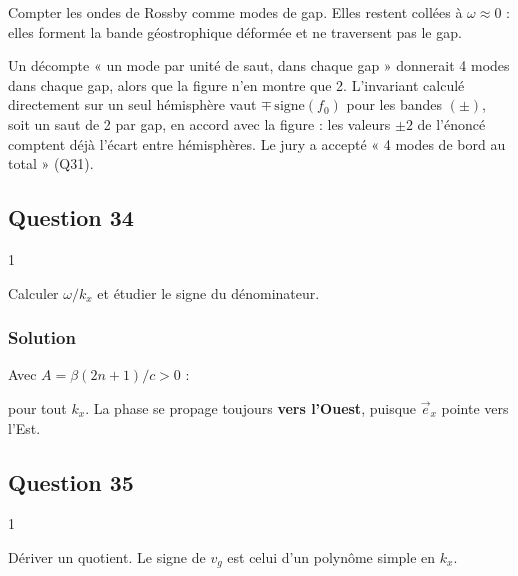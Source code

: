 \documentclass[11pt,a4paper]{article}
\newcommand{\equationajustee}[1]{%
  \sbox{\boiteequation}{$\displaystyle #1$}%
  \ifdim\wd\boiteequation>\linewidth
    \[\resizebox{\linewidth}{!}{\usebox{\boiteequation}}\]%
  \else
    \[#1\]%
  \fi}
\begin{document}
\begin{piege}

Compter les ondes de Rossby comme modes de gap. Elles restent collées à \(\omega\approx0\) : elles forment la bande géostrophique déformée et ne traversent pas le gap.

\end{piege}

\begin{piege}

Un décompte « un mode par unité de saut, dans chaque gap » donnerait 4 modes dans chaque gap, alors que la figure n'en montre que 2. L'invariant calculé directement sur un seul hémisphère vaut \(\mp\,\mathrm{signe}(f_0)\) pour les bandes \((\pm)\), soit un saut de 2 par gap, en accord avec la figure : les valeurs \(\pm2\) de l'énoncé comptent déjà l'écart entre hémisphères. Le jury a accepté « 4 modes de bord au total » (Q31).

\end{piege}

\hypertarget{question-34}{%
\subsection{Question 34}\label{question-34}}

\begin{indication}{1}

Calculer \(\omega/k_x\) et étudier le signe du dénominateur.

\end{indication}

\hypertarget{solution-42}{%
\subsubsection{Solution}\label{solution-42}}

Avec \(A=\beta(2n+1)/c>0\) :

\equationajustee{\boxed{v_\varphi=-\frac{\beta}{k_x^2+A}<0}}

pour tout \(k_x\). La phase se propage toujours \textbf{vers l'Ouest}, puisque \(\vec e_x\) pointe vers l'Est.

\hypertarget{question-35}{%
\subsection{Question 35}\label{question-35}}

\begin{indication}{1}

Dériver un quotient. Le signe de \(v_g\) est celui d'un polynôme simple en \(k_x\).

\end{indication}
\end{document}
